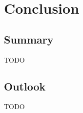 \documentclass{IEEEtran}
\begin{document}
    \section{Conclusion}
    \label{sec:conclusion}

    \subsection*{Summary}
    TODO

    \subsection*{Outlook}
    TODO

    
    

\end{document}
